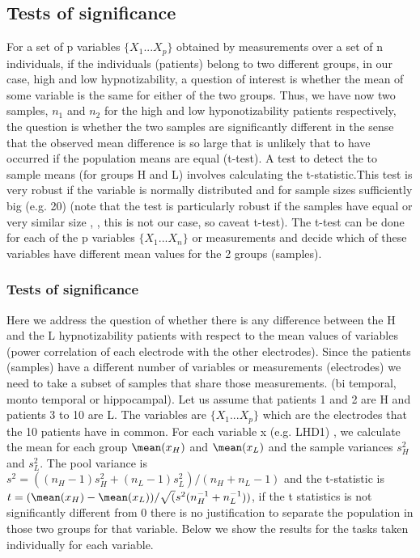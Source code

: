 \documentclass[11pt, onecolumn]{article}
\begin{document}
\subsection{Tests of significance}
For a set of p variables $\{X_1 ... X_p\}$ obtained by measurements over a set of n individuals, if the individuals (patients) belong to two different groups, in our case, high and low hypnotizability, a question of interest is whether the mean of some  variable is the same for either of the two groups. Thus, we have now two samples, $n_1$ and $n_2$ for the high and low hyponotizability patients respectively, the question is whether the two samples are significantly different in the sense that the observed mean difference is so large that is unlikely that to have occurred if the population means are equal (t-test). 
A test to detect the to sample means (for groups H and L) involves calculating the t-statistic.This test is very robust if the variable is normally distributed and for sample sizes sufficiently big (e.g. 20) (note that the test is particularly robust if the samples have equal or very similar size \citep{carter_effect_1979s},\citep{coombs_univariate_1996} , this is not our case, so caveat t-test). The t-test can be done for each of the p variables  $\{X_1 ... X_n\}$ or measurements and decide which of these variables have different mean values for the 2 groups (samples).

\subsubsection{Tests of significance}
Here we address the question of whether there is any difference
between the H and the L hypnotizability patients with respect to the mean values of variables (power correlation of each electrode with the other electrodes). Since the patients (samples) have a different number of variables or measurements (electrodes) we need to take a subset of samples that share those measurements. (bi temporal, monto temporal or hippocampal).
Let us assume that patients 1 and 2 are H and patients 3 to 10 are L. The variables are 
$\{X_1 ... X_p\}$ which are the electrodes that the 10 patients have in common.
For each variable x (e.g. LHD1)
, we calculate the mean for each group $\mean(x_H)$ and $\mean(x_L)$ and the sample variances $s^2_H$ and $s^2_L$. The pool variance is $s^2= ((n_H-1)s^2_H + (n_L-1)s^2_L)/(n_H+n_L -1)$ and the t-statistic is $t= (\mean(x_H) - \mean(x_L))/\sqrt(s^2(n_H^{-1} + n_L^{-1}))$, if the t statistics is not significantly different from 0 there is no justification to separate the population in those two groups for that variable. Below we show the results for the tasks taken individually for each variable.
\end{document}
